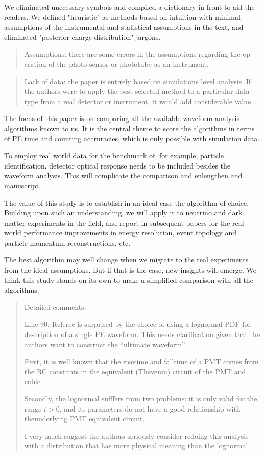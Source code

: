 \documentclass[12pt]{article}
\begin{document}
We eliminated unecessary symbols and compiled a dictionary in front to aid the readers.  We defined "heuristic" as methods based on intuition with minimal assumptions of the instrumental and statistical assumptions in the text, and eliminated "posterior charge distribution" jargons.

\begin{quote}
Assumptions: there are some errors in the assumptions regarding the op- eration of the photo-sensor or phototube as an instrument.
\end{quote}

\begin{quote}
Lack of data: the paper is entirely based on simulations level analysis. If the authors were to apply the best selected method to a particular data type from a real detector or instrument, it would add considerable value.
\end{quote}

The focus of this paper is on comparing all the available waveform analysis algorithms known to us.  It is the central theme to score the algorithms in terms of PE time and counting accruracies, which is only possible with simulation data.

To employ real world data for the benchmark of, for example, particle identification, detector optical response needs to be included besides the waveform analysis.  This will complicate the comparison and enlengthen and manuscript.

The value of this study is to establish in an ideal case the algorithm of choice.  Building upon such an understanding, we will apply it to neutrino and dark matter experiments in the field, and report in subsequent papers for the real world performance improvements in energy resolution, event topology and particle momentum reconstructions, etc.

The best algorithm may well change when we migrate to the real experiments from the ideal assumptions.  But if that is the case, new insights will emerge.  We think this study stands on its own to make a simplified comparison with all the algorithms.

\begin{quote}

Detailed comments:

Line 90: Referee is surprised by the choice of using a lognormal PDF for description of a single PE waveform. This needs clarification given that the authors want to construct the ``ultimate waveform''.

First, it is well known that the risetime and falltime of a PMT comes from the RC constants in the equivalent (Thevenin) circuit of the PMT and cable. 

Secondly, the lognormal sufffers from two problems: it is only valid for the range $t>0$, and its parameters do not have a good relationship with theunderlying PMT equivalent circuit.

I very much suggest the authors seriously consider redoing this analysis with a distribution that has more physical meaning than the lognormal. 
\end{quote}
\end{document}
